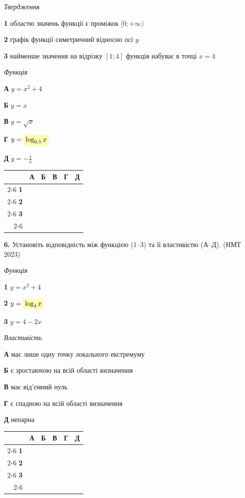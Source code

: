 \documentclass[14pt]{extarticle}
\newcommand{\answerGridSmall}{
    \begingroup
    \renewcommand{\arraystretch}{1.2} 
    \setlength{\tabcolsep}{5pt} 
    \begin{tabular}{r|c|c|c|c|c|}
         \multicolumn{1}{c}{} & \multicolumn{1}{c}{\textbf{А}} & \multicolumn{1}{c}{\textbf{Б}} & \multicolumn{1}{c}{\textbf{В}} & \multicolumn{1}{c}{\textbf{Г}} & \multicolumn{1}{c}{\textbf{Д}} \\ \cline{2-6}
         \textbf{1} & & & & & \\ \cline{2-6}
         \textbf{2} & & & & & \\ \cline{2-6}
         \textbf{3} & & & & & \\ \cline{2-6}
    \end{tabular}
    \endgroup
}
\newcommand{\matchingLayoutBottom}[2]{
    \noindent
    \begin{minipage}[t]{0.48\textwidth}
        #1
    \end{minipage}%
    \hfill
    \begin{minipage}[t]{0.48\textwidth}
        #2
    \end{minipage}
    
    \vspace{0.5cm}
    
    \noindent
    \answerGridSmall
}
\newcommand{\nmtyear}[1]{\hfill{\small\color{yearcolor}(НМТ #1)}}
\begin{document}
\matchingLayoutBottom{\textit{Твердження}

\textbf{1} \quad областю значень функції є проміжок $[0; +\infty)$

\textbf{2} \quad графік функції симетричний відносно осі $y$

\textbf{3} \quad найменше значення на відрізку $[1; 4]$ функція набуває в точці $x = 4$
}{
\textit{Функція}

\textbf{А} \quad $y = x^2 + 4$

\textbf{Б} \quad $y = x$

\textbf{В} \quad $y = \sqrt{x}$

\textbf{Г} \quad $y = \colorbox{yellow!30}{$\log_{0,5} x$}$

\textbf{Д} \quad $y = -\displaystyle\frac{1}{x}$
}

\vspace{1cm}

\noindent\textbf{6.} Установіть відповідність між функцією (1--3) та її властивістю (А--Д). \nmtyear{2023}
\vspace{0.3cm}

\matchingLayoutBottom{\textit{Функція}

\textbf{1} \quad $y = x^2 + 4$

\textbf{2} \quad $y = \colorbox{yellow!30}{$\log_4 x$}$

\textbf{3} \quad $y = 4 - 2x$
}{
\textit{Властивість}

\textbf{А} \quad має лише одну точку локального екстремуму

\textbf{Б} \quad є зростаючою на всій області визначення

\textbf{В} \quad має від'ємний нуль

\textbf{Г} \quad є спадною на всій області визначення

\textbf{Д} \quad непарна
}
\end{document}
